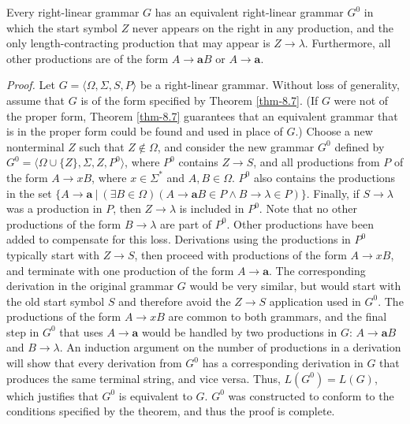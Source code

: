 \begin{thm}\label{thm-8.8}
Every right-linear grammar $G$ has an equivalent right-linear grammar $G^0$ in
which the start symbol $Z$ never appears on the right in any production, and the
only length-contracting production that may appear is $Z\rightarrow\lambda$.
Furthermore, all other productions are of the form $A\rightarrow\pmb{a}B$ or $A
\rightarrow\pmb{a}$.

\emph{Proof.} Let $G = \langle\Omega,\Sigma,S,P\rangle$ be a right-linear
grammar. Without loss of generality, assume that $G$ is of the form specified by
Theorem \ref{thm-8.7}. (If $G$ were not of the proper form, Theorem \ref{thm-8.7} guarantees that an
equivalent grammar that is in the proper form could be found and used in place
of $G$.) Choose a new nonterminal $Z$ such that $Z\not \in\Omega$, and consider
the new grammar $G^0$ defined by $G^0 = \langle\Omega\cup\{Z\},\Sigma,Z,P^0
\rangle$, where $P^0$ contains $Z\rightarrow S$, and all productions from $P$
of the form $A\rightarrow xB$, where $x\in\Sigma^*$ and $A,B \in\Omega$. $P^0$
also contains the productions in the set $\{A\rightarrow\pmb{a}\ |\ (\exists B\in
\Omega)(A\rightarrow\pmb{a}B\in P \wedge B\rightarrow\lambda\in P)\}$. Finally,
if $S\rightarrow\lambda$ was a production in $P$, then $Z\rightarrow\lambda$ is
included in $P^0$. Note that no other productions of the form $B\rightarrow
\lambda$ are part of $P^0$. Other productions have been added to compensate for
this loss. Derivations using the productions in $P^0$ typically start with $Z
\rightarrow S$, then proceed with productions of the form $A\rightarrow xB$, and
terminate with one production of the form $A\rightarrow\pmb{a}$. The
corresponding derivation in the original grammar $G$ would be very similar, but
would start with the old start symbol $S$ and therefore avoid the $Z\rightarrow
S$ application used in $G^0$. The productions of the form $A\rightarrow xB$ are
common to both grammars, and the final step in $G^0$ that uses $A\rightarrow
\pmb{a}$ would be handled by two productions in $G$: $A\rightarrow\pmb{a}B$ and
$B\rightarrow\lambda$. An induction argument on the number of productions in a
derivation will show that every derivation from $G^0$ has a corresponding
derivation in $G$ that produces the same terminal string, and vice versa. Thus,
$L(G^0)=L(G)$, which justifies that $G^0$ is equivalent to $G$. $G^0$ was
constructed to conform to the conditions specified by the theorem, and thus the
proof is complete.
\end{thm}

